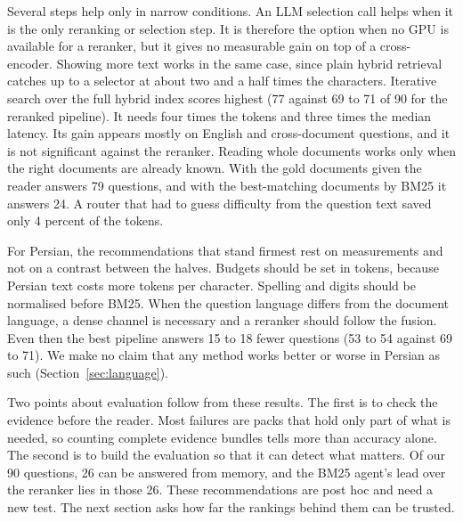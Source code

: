 Several steps help only in narrow conditions. An LLM selection call helps when it is the only reranking or selection step. It is therefore the option when no GPU is available for a reranker, but it gives no measurable gain on top of a cross-encoder. Showing more text works in the same case, since plain hybrid retrieval catches up to a selector at about two and a half times the characters. Iterative search over the full hybrid index scores highest (77 against 69 to 71 of 90 for the reranked pipeline). It needs four times the tokens and three times the median latency. Its gain appears mostly on English and cross-document questions, and it is not significant against the reranker. Reading whole documents works only when the right documents are already known. With the gold documents given the reader answers 79 questions, and with the best-matching documents by BM25 it answers 24. A router that had to guess difficulty from the question text saved only 4 percent of the tokens.

For Persian, the recommendations that stand firmest rest on measurements and not on a contrast between the halves. Budgets should be set in tokens, because Persian text costs more tokens per character. Spelling and digits should be normalised before BM25. When the question language differs from the document language, a dense channel is necessary and a reranker should follow the fusion. Even then the best pipeline answers 15 to 18 fewer questions (53 to 54 against 69 to 71). We make no claim that any method works better or worse in Persian as such (Section~\ref{sec:language}).

Two points about evaluation follow from these results. The first is to check the evidence before the reader. Most failures are packs that hold only part of what is needed, so counting complete evidence bundles tells more than accuracy alone. The second is to build the evaluation so that it can detect what matters. Of our 90 questions, 26 can be answered from memory, and the BM25 agent's lead over the reranker lies in those 26. These recommendations are post hoc and need a new test. The next section asks how far the rankings behind them can be trusted.
